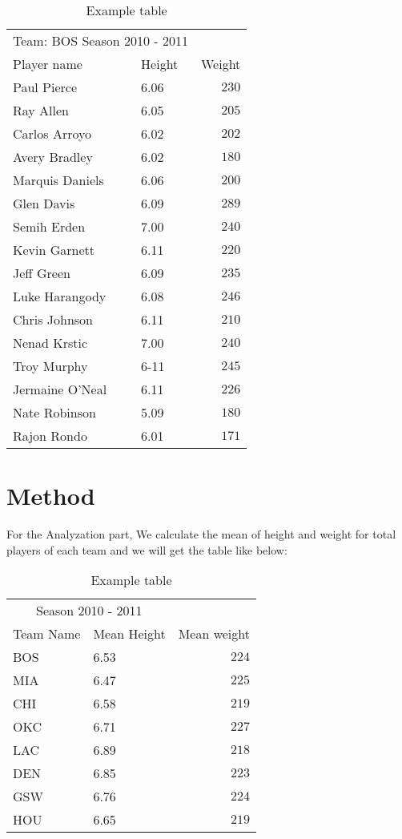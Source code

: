 \documentclass[twoside]{article}
\begin{document}
\begin{multicols}{2}
\begin{table}[H]
\begin{tabular}{llr}
\bottomrule
\end{tabular}
\end{table}


\begin{table}[H]
\caption{Example table}
\centering
\begin{tabular}{llr}
\toprule
\multicolumn{2}{c}{Team: BOS Season 2010 - 2011} \\
\cmidrule(r){1-2}
Player name & Height & Weight \\
\midrule
Paul Pierce & 6.06 & $230$\\
Ray Allen	& 6.05 & $205$\\	
Carlos Arroyo & 6.02 & $202$\\	
Avery Bradley & 6.02 & $180$\\	
Marquis Daniels	& 6.06 & $200$\\
Glen Davis &6.09& $289$\\	
Semih Erden	&7.00& $240$\\	
Kevin Garnett &6.11& $220$\\	
Jeff Green &6.09& $235$\\	
Luke Harangody	&6.08&	$246$\\	
Chris Johnson	&6.11& $210$\\	
Nenad Krstic	&7.00& $240$\\
Troy Murphy	&6-11& $245$\\	
Jermaine O'Neal	&6.11&	$226$\\	
Nate Robinson &5.09& $180$\\
Rajon Rondo	&6.01& $171$\\	


\bottomrule
\end{tabular}
\end{table}


\section{Method}


For the Analyzation part, We calculate the mean of height and weight for total players of each team and we will get the table like below:

\begin{table}[H]
\caption{Example table}
\centering
\begin{tabular}{llr}
\toprule
\multicolumn{2}{c}{Season 2010 - 2011} \\
\cmidrule(r){1-2}
Team Name & Mean Height & Mean weight \\
\midrule
BOS & 6.53 & $224$\\
MIA	& 6.47 & $225$\\	
CHI & 6.58 & $219$\\	
OKC & 6.71 & $227$\\	
LAC	& 6.89 & $218$\\
DEN & 6.85 & $223$\\	
GSW	& 6.76 & $224$\\	
HOU & 6.65 & $219$\\	
\bottomrule
\end{tabular}
\end{table}


\end{multicols}
\end{document}
